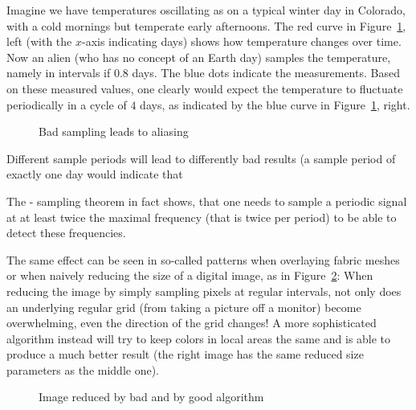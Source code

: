 Imagine we  have temperatures oscillating as on a typical winter day in
Colorado, with a cold mornings but temperate early afternoons. The red curve
in Figure~\ref{figalias}, left (with the $x$-axis indicating days) shows
how temperature changes over time. Now an alien (who has no concept of an
Earth day) samples the temperature, namely in intervals if $0.8$ days. The
blue dots indicate the measurements. Based on these measured values, one
clearly would expect the temperature to fluctuate periodically in a cycle of
$4$ days, as indicated by the blue curve in Figure~\ref{figalias}, right.
\begin{figure}
\begin{center}
\quad
\end{center}
\caption{Bad sampling leads to aliasing}
\label{figalias}
\end{figure}
Different sample periods will lead to differently bad results (a sample
period of exactly one day would indicate that

The - sampling theorem in fact shows, that
one needs to sample a periodic signal at at least twice the maximal
frequency (that is twice per period) to be able to detect these frequencies.


The same effect can be seen in so-called  patterns when
overlaying fabric meshes or when naively reducing the size of a digital
image, as in Figure~\ref{figscreenpic}: When reducing the image by simply
sampling pixels at regular intervals, not only does an underlying regular
grid (from taking a picture off a monitor) become overwhelming, even the
direction of the grid changes! A more sophisticated algorithm instead will
try to keep colors in local areas the same and is able to produce a much
better result (the right image has the same reduced size parameters as the
middle one).
\begin{figure}
\begin{center}
\quad
\quad
\end{center}
\caption{Image reduced by bad and by good algorithm}
\label{figscreenpic}
\end{figure}

